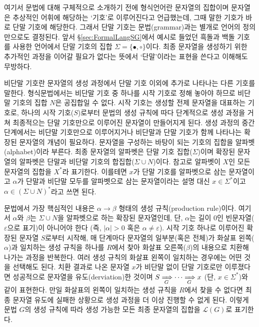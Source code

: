 \documentclass[b5paper,chapter,figtabcapt]{oblivoir}
\newcommand{\txtbullet}[0]{\ensuremath{\bullet}}
\newcommand{\txtcircle}[0]{\ensuremath{\circ}}
\begin{document}
여기서 문법에 대해 구체적으로 소개하기 전에 형식언어란 문자열의 집합이며
문자열은 추상적인 어휘에 해당하는 `기호'로 이루어진다고 언급했는데,
그때 말한 기호가 바로 단말 기호에 해당한다.
그래서 단말 기호는 문법(grammar)과는 별개로 언어의 정의만으로도 결정된다.
앞서 \S\ref{sec:FormalLangSG}에서 예시로 들었던 흑돌과 백돌 기호를 사용한
언어에서 단말 기호의 집합 $\Sigma = \{\txtbullet, \txtcircle\}$이다.
최종 문자열을 생성하기 위한 추가적인 과정을 이어갈 필요가 없다는 뜻에서
`단말'이라는 표현을 쓴다고 이해해도 무방하다.

비단말 기호란 문자열의 생성 과정에서 단말 기호 이외에 추가로 나타나는
다른 기호를 말한다. 형식문법에서는 비단말 기호 중 하나를 시작 기호로
정해 놓아야 하므로 비단말 기호의 집합 $N$은 공집합일 수 없다. 시작 기호는
생성할 전제 문자열을 대표하는 기호로, 하나의 시작 기호($S$)로부터 문법의
생성 규칙에 따다 단계적으로 생성 과정을 거쳐 최종적으는 단말 기호만으로
이루어진 문자열이 만들어지게 된다. 생성 과정의 중간 단계에서는 비단말 기호만으로
이루어지거나 비단말과 단말 기호가 함께 나타나는 확장된 문자열의 개념이 필요하다.
문자열을 구성하는 바탕이 되는 기호의 집합을 알파벳(alphabet)이라 부른다.
최종 문자열의 알파벳은 단말 기호 집합($\Sigma$)이며 확장된 문자열의 알파벳은
단말과 비단말 기호의 합집합($\Sigma\cup N$)이다. 참고로 알파벳이 $X$인
모든 문자열의 집합을 $X^{*}$라 표기한다. 이를테면
$x$가 단말 기호를 알파벳으로 삼는 문자열이고
$\alpha$가 단말과 비단말 모두를 알파벳으로 삼는 문자열이라는
설명 대신 $x\in\Sigma^{*}$이고 $\alpha\in(\Sigma\cup N)^{*}$라고 쓰면 된다.

문법에서 가장 핵심적인 내용은 $\alpha\to\beta$ 형태의 생성 규칙(production rule)이다.
여기서 $\alpha$와 $\beta$는  $\Sigma\cup N$을 알파벳으로 하는 확장된 문자열인데,
단, $\alpha$는 길이 0인 빈문자열($\varepsilon$으로 표기)이 아니어야 한다
(즉, $\lvert\alpha\rvert>0$ 혹은 $\alpha\neq\varepsilon$).
시작 기호 하나로 이루어진 확장된 문자열 $S$로부터 시작해, 매 단계마다
문자열의 일부분(혹은 전체)가 화살표 왼쪽($\alpha$)과 일치하는 생성 규칙을
하나를 $R$에서 찾아 화살표 오른쪽($\beta$)의 내용으로 치환해 나가는 과정을
반복한다. 여러 생성 규칙의 화살표 왼쪽이 일치하는 경우에는 어떤 것을 선택해도 된다.
치환 결과로 나온 문자열 $x$가 비단말 없이 단말 기호로만 이루졌다면
성공적으로 문자열을 유도(derviation)한 것이며
$S\xRightarrow[\,G]{} \cdots \xRightarrow[\,G]{} x$ (단, $x\in\Sigma^{*}$)와 같이 표현한다.
만일 화살표의 왼쪽이 일치하는 생성 규칙을 $R$에서 찾을 수 없다면
최종 문자열 유도에 실패한 상황으로 생성 과정을 더 이상 진행할 수 없게 된다.
이렇게 문법 $G$의 생성 규칙에 따라 생성 가능한 모든 최종 문자열의 집합을
$\mathcal{L}(G)$로 표기한다.
\end{document}
